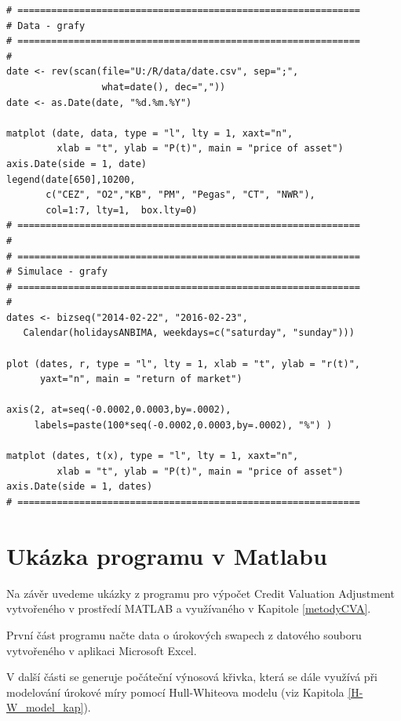 \documentclass[a4paper,12pt]{report}
\theoremstyle{definition} \newtheorem{definice}[veta]{Definice}
\theoremstyle{remark}
\begin{document}
\begin{verbatim}
# =============================================================
# Data - grafy
# =============================================================
#
date <- rev(scan(file="U:/R/data/date.csv", sep=";", 
                 what=date(), dec=","))
date <- as.Date(date, "%d.%m.%Y") 

matplot (date, data, type = "l", lty = 1, xaxt="n", 
         xlab = "t", ylab = "P(t)", main = "price of asset")
axis.Date(side = 1, date)
legend(date[650],10200, 
       c("CEZ", "O2","KB", "PM", "Pegas", "CT", "NWR"), 
       col=1:7, lty=1,  box.lty=0) 
# =============================================================
#
# =============================================================
# Simulace - grafy
# =============================================================
#
dates <- bizseq("2014-02-22", "2016-02-23",
   Calendar(holidaysANBIMA, weekdays=c("saturday", "sunday")))

plot (dates, r, type = "l", lty = 1, xlab = "t", ylab = "r(t)", 
      yaxt="n", main = "return of market")

axis(2, at=seq(-0.0002,0.0003,by=.0002), 
     labels=paste(100*seq(-0.0002,0.0003,by=.0002), "%") )

matplot (dates, t(x), type = "l", lty = 1, xaxt="n", 
         xlab = "t", ylab = "P(t)", main = "price of asset")
axis.Date(side = 1, dates)
# =============================================================
\end{verbatim}

\newpage
\section*{Ukázka programu v Matlabu}
Na závěr uvedeme ukázky z programu pro výpočet Credit Valuation Adjustment  vytvořeného v prostředí MATLAB a využívaného v Kapitole \ref{metodyCVA}.

První část programu načte data o úrokových swapech z datového souboru vytvořeného v aplikaci Microsoft Excel. 

V další části se generuje počáteční výnosová křivka, která se dále využívá při modelování úrokové míry pomocí Hull-Whiteova modelu (viz Kapitola \ref{H-W_model_kap}).
\end{document}

